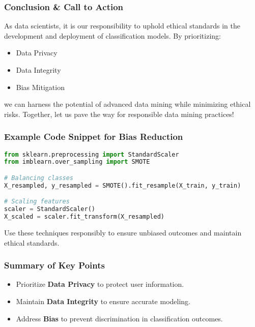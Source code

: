 \documentclass[aspectratio=169]{beamer}
\begin{document}
\begin{frame}[fragile]
    \frametitle{Conclusion \& Call to Action}
    As data scientists, it is our responsibility to uphold ethical standards in the development and deployment of classification models. By prioritizing:
    \begin{itemize}
        \item Data Privacy
        \item Data Integrity
        \item Bias Mitigation
    \end{itemize}
    we can harness the potential of advanced data mining while minimizing ethical risks. 
    Together, let us pave the way for responsible data mining practices!
\end{frame}

\begin{frame}[fragile]
    \frametitle{Example Code Snippet for Bias Reduction}
    \begin{lstlisting}[language=Python]
from sklearn.preprocessing import StandardScaler
from imblearn.over_sampling import SMOTE

# Balancing classes
X_resampled, y_resampled = SMOTE().fit_resample(X_train, y_train)

# Scaling features
scaler = StandardScaler()
X_scaled = scaler.fit_transform(X_resampled)
    \end{lstlisting}
    Use these techniques responsibly to ensure unbiased outcomes and maintain ethical standards.
\end{frame}

\begin{frame}[fragile]
    \frametitle{Summary of Key Points}
    \begin{itemize}
        \item Prioritize \textbf{Data Privacy} to protect user information.
        \item Maintain \textbf{Data Integrity} to ensure accurate modeling.
        \item Address \textbf{Bias} to prevent discrimination in classification outcomes.
    \end{itemize}
\end{frame}
\end{document}
